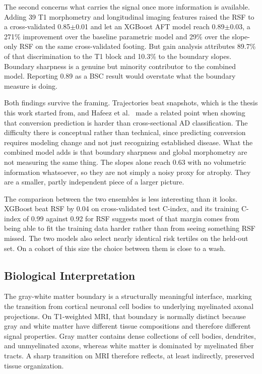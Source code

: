 \documentclass[blue]{ludusofficial}  %
\begin{document}
The second concerns what carries the signal once more information is available. Adding 39 T1 morphometry and longitudinal imaging features raised the RSF to a cross-validated 0.85$\pm$0.01 and let an XGBoost AFT model reach 0.89$\pm$0.03, a 271\% improvement over the baseline parametric model and 29\% over the slope-only RSF on the same cross-validated footing. But gain analysis attributes 89.7\% of that discrimination to the T1 block and 10.3\% to the boundary slopes. Boundary sharpness is a genuine but minority contributor to the combined model. Reporting 0.89 as a BSC result would overstate what the boundary measure is doing.

Both findings survive the framing. Trajectories beat snapshots, which is the thesis this work started from, and Hafeez et al.~\cite{hafeez2024deep} made a related point when showing that conversion prediction is harder than cross-sectional AD classification. The difficulty there is conceptual rather than technical, since predicting conversion requires modeling change and not just recognizing established disease. What the combined model adds is that boundary sharpness and global morphometry are not measuring the same thing. The slopes alone reach 0.63 with no volumetric information whatsoever, so they are not simply a noisy proxy for atrophy. They are a smaller, partly independent piece of a larger picture.

The comparison between the two ensembles is less interesting than it looks. XGBoost beat RSF by 0.04 on cross-validated test C-index, and its training C-index of 0.99 against 0.92 for RSF suggests most of that margin comes from being able to fit the training data harder rather than from seeing something RSF missed. The two models also select nearly identical risk tertiles on the held-out set. On a cohort of this size the choice between them is close to a wash.

\subsection{Biological Interpretation}

The gray-white matter boundary is a structurally meaningful interface, marking the transition from cortical neuronal cell bodies to underlying myelinated axonal projections. On T1-weighted MRI, that boundary is normally distinct because gray and white matter have different tissue compositions and therefore different signal properties. Gray matter contains dense collections of cell bodies, dendrites, and unmyelinated axons, whereas white matter is dominated by myelinated fiber tracts. A sharp transition on MRI therefore reflects, at least indirectly, preserved tissue organization.
\end{document}
